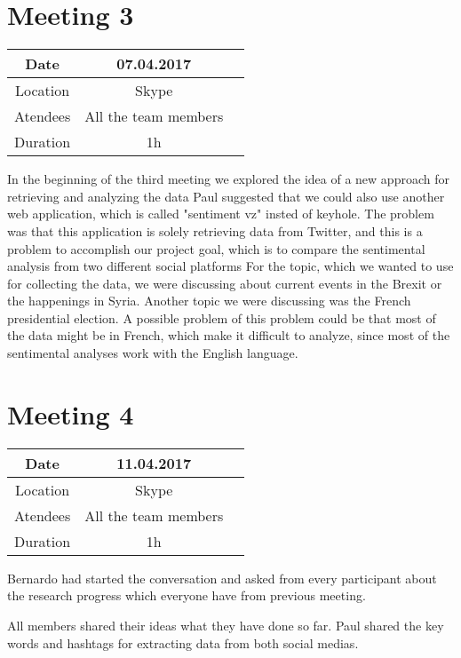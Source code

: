 \section{Meeting 3}
\begin{center}
	\begin{tabular}{| c | c | c }
		\hline
		Date & 	07.04.2017   \\
		\hline
		Location & Skype  \\
		\hline
		Atendees & All the team members   \\
		\hline
		Duration & 1h  \\
		\hline
	\end{tabular}
\end{center}
In the beginning of the third meeting we explored the idea of a new approach for retrieving and analyzing the data Paul suggested that we could also use another web application, which is called "sentiment vz" insted of keyhole.
The problem was that this application is solely
retrieving data from Twitter, and this is a problem to
accomplish our project goal, which is to compare the
sentimental analysis from two different social
platforms
For the topic, which we wanted to use for collecting the
data, we were discussing about current events in the Brexit or the happenings in Syria.
Another topic we were discussing was the French
presidential election. A possible problem of this
problem could be that most of the data might be in
French, which make it difficult to analyze, since most of
the sentimental analyses work with the English
language.

\section{Meeting 4}
\begin{center}
	\begin{tabular}{| c | c | c }
		\hline
		Date & 	11.04.2017   \\
		\hline
		Location & Skype  \\
		\hline
		Atendees & All the team members   \\
		\hline
		Duration & 1h  \\
		\hline
	\end{tabular}
\end{center}
Bernardo had started the conversation and asked from every
participant about the research progress which everyone have
from previous meeting.

All members shared their ideas what they have done so far.
Paul shared the key words and hashtags for extracting data
from both social medias.

